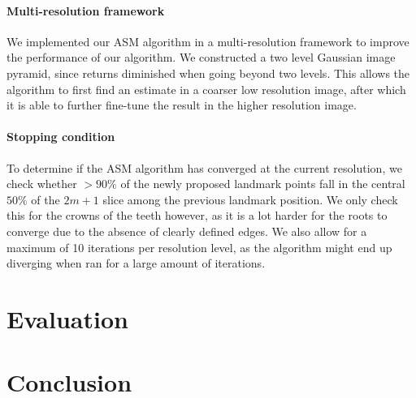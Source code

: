 \documentclass[a4paper,titlepage,12pt]{article}
\begin{document}
\paragraph{Multi-resolution framework}
We implemented our ASM algorithm in a multi-resolution framework to improve the performance of our algorithm.
We constructed a two level Gaussian image pyramid, since returns diminished when going beyond two levels.
This allows the algorithm to first find an estimate in a coarser low resolution image, after which it is able to further fine-tune the result in the higher resolution image.

\paragraph{Stopping condition}

To determine if the ASM algorithm has converged at the current resolution, we check whether $>90\%$ of the newly proposed landmark points fall in the central $50\%$ of the $2m + 1$ slice among the previous landmark position.
We only check this for the crowns of the teeth however, as it is a lot harder for the roots to converge due to the absence of clearly defined edges.
We also allow for a maximum of 10 iterations per resolution level, as the algorithm might end up diverging when ran for a large amount of iterations.




\section{Evaluation}
\label{sec:eval}


\section{Conclusion}
\label{sec:concl}




\end{document}
